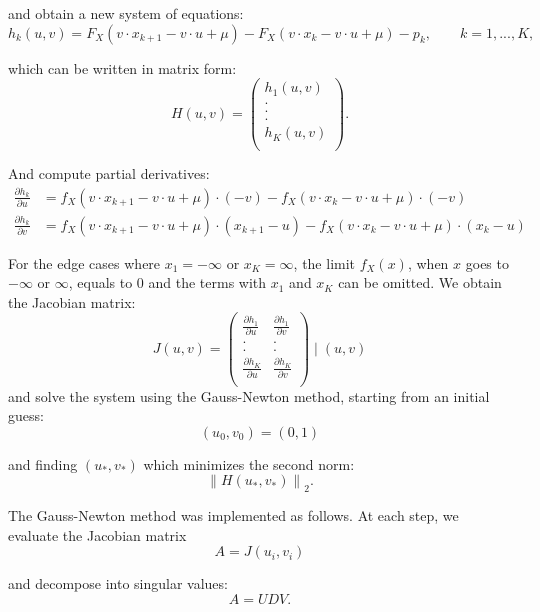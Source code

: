 \documentclass[10pt]{article}
\newcommand{\norm}[1]{\left\lVert#1\right\rVert}
\begin{document}
and obtain a new system of equations:
\begin{equation}
h_{k}(u, v) = 
F_{X}(v \cdot x_{k+1} - v \cdot u + \mu) -
F_{X}(v \cdot x_{k} - v \cdot u + \mu) - p_{k}, \qquad k = 1, ..., K,
\end{equation}

which can be written in matrix form:
\[ H(u,v) = \left( \begin{array}{cc}
h_{1}(u,v) \\
. \\
. \\
. \\
h_{K}(u,v) \\ \end{array} \right).
\]

And compute partial derivatives:
\begin{align*}
\frac{\partial h_{k}}{\partial u} &= f_{X}(v \cdot x_{k+1} - v \cdot u + \mu) \cdot (-v) - f_{X}(v \cdot x_{k} - v \cdot u + \mu) \cdot (-v) \\
\frac{\partial h_{k}}{\partial v} &= f_{X}(v \cdot x_{k+1} - v \cdot u + \mu) \cdot (x_{k+1} - u) 
- f_{X}(v \cdot x_{k} - v \cdot u + \mu) \cdot (x_{k} - u)
\end{align*}

For the edge cases where $x_{1} = -\infty$ or $x_{K} = \infty$, the limit $f_{X}(x)$, when $x$ goes to $-\infty$ or $\infty$, equals to 0 and the terms with $x_{1}$ and $x_{K}$ can be omitted. We obtain the Jacobian matrix:
\[ J(u,v) = \left( \begin{array}{ccc}
\frac{\partial h_{1}}{\partial u} & \frac{\partial h_{1}}{\partial v} \\
. & . \\
. & . \\
\frac{\partial h_{K}}{\partial u} & \frac{\partial h_{K}}{\partial v} \\ \end{array} \right) \mid (u,v)
\]
and solve the system using the Gauss-Newton method, starting from an initial guess: 
$$
(u_{0}, v_{0}) = (0, 1)
$$ 

and finding $(u_{*}, v_{*})$ which minimizes the second norm:
\begin{equation}
\norm{H(u_{*}, v_{*})}_{2}.
\end{equation}


The Gauss-Newton method was implemented as follows. At each step, we evaluate the Jacobian matrix
$$
A = J(u_{i}, v_{i})
$$

and decompose into singular values: 
$$
A = U D V.
$$
\end{document}
